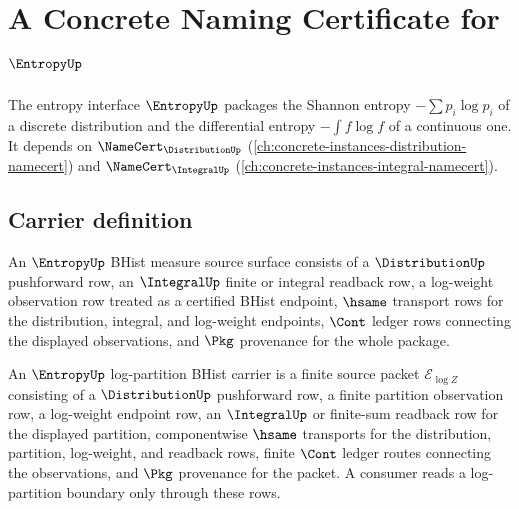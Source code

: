 \chapter{A Concrete Naming Certificate for $\EntropyUp$}
\label{ch:concrete-instances-entropy-namecert}

The entropy interface $\EntropyUp$ packages the Shannon entropy $-\sum p_i \log p_i$ of a discrete distribution and the differential entropy $-\int f \log f$ of a continuous one. It depends on $\NameCert_{\DistributionUp}$ (\autoref{ch:concrete-instances-distribution-namecert}) and $\NameCert_{\IntegralUp}$ (\autoref{ch:concrete-instances-integral-namecert}).

\section{Carrier definition}
\label{sec:entropy-carrier}

\begin{definition}
\label{def:entropy-bhist-measure-source-surface}
An $\EntropyUp$ BHist measure source surface consists of a
$\DistributionUp$ pushforward row, an $\IntegralUp$ finite or integral readback
row, a log-weight observation row treated as a certified BHist endpoint,
$\hsame$ transport rows for the distribution, integral, and log-weight
endpoints, $\Cont$ ledger rows connecting the displayed observations, and
$\Pkg$ provenance for the whole package.
\end{definition}

\begin{definition}
\label{def:entropy-log-partition-bhist-carrier}
An $\EntropyUp$ log-partition BHist carrier is a finite source packet
$\mathcal E_{\log Z}$ consisting of a $\DistributionUp$ pushforward row, a
finite partition observation row, a log-weight endpoint row, an $\IntegralUp$
or finite-sum readback row for the displayed partition, componentwise $\hsame$
transports for the distribution, partition, log-weight, and readback rows,
finite $\Cont$ ledger routes connecting the observations, and $\Pkg$
provenance for the packet. A consumer reads a log-partition boundary only
through these rows.
\end{definition}

